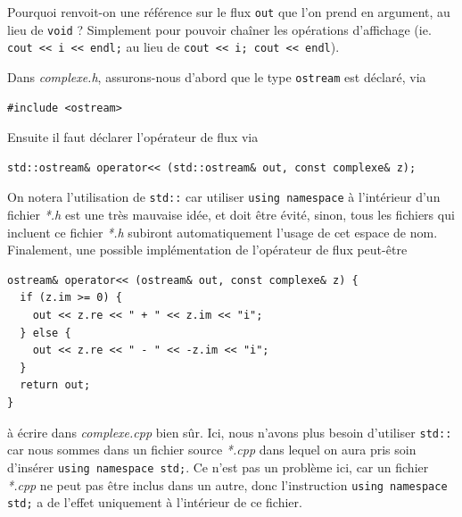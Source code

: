 \documentclass{book}
\newcommand{\inline}[1]{\texttt{#1}}
\def\filename{\emph}
\begin{document}
Pourquoi renvoit-on une référence sur le flux \inline{out} que l'on prend en argument, au lieu de \inline{void} ? Simplement pour pouvoir chaîner les opérations d'affichage (ie. \inline{cout << i << endl;} au lieu de \inline{cout << i; cout << endl}).

\begin{correction}
Dans \filename{complexe.h}, assurons-nous d'abord que le type \inline{ostream} est déclaré, via
\begin{verbatim}
#include <ostream>
\end{verbatim}
Ensuite il faut déclarer l'opérateur de flux via
\begin{verbatim}
std::ostream& operator<< (std::ostream& out, const complexe& z);
\end{verbatim}

On notera l'utilisation de \inline{std::} car utiliser \inline{using namespace} à l'intérieur d'un fichier \filename{*.h} est une très mauvaise idée, et doit être évité, sinon, tous les fichiers qui incluent ce fichier \emph{*.h} subiront automatiquement l'usage de cet espace de nom.\\

Finalement, une possible implémentation de l'opérateur de flux peut-être
\begin{verbatim}
ostream& operator<< (ostream& out, const complexe& z) {
  if (z.im >= 0) {
    out << z.re << " + " << z.im << "i";
  } else {
    out << z.re << " - " << -z.im << "i";
  }
  return out;
}
\end{verbatim}
à écrire dans \filename{complexe.cpp} bien sûr. Ici, nous n'avons plus besoin d'utiliser \inline{std::} car nous sommes dans un fichier source \filename{*.cpp} dans lequel on aura pris soin d'insérer \inline{using namespace std;}. Ce n'est pas un problème ici, car un fichier \filename{*.cpp} ne peut pas être inclus dans un autre, donc l'instruction \inline{using namespace std;} a de l'effet uniquement à l'intérieur de ce fichier.\\
\end{correction}
\end{document}
